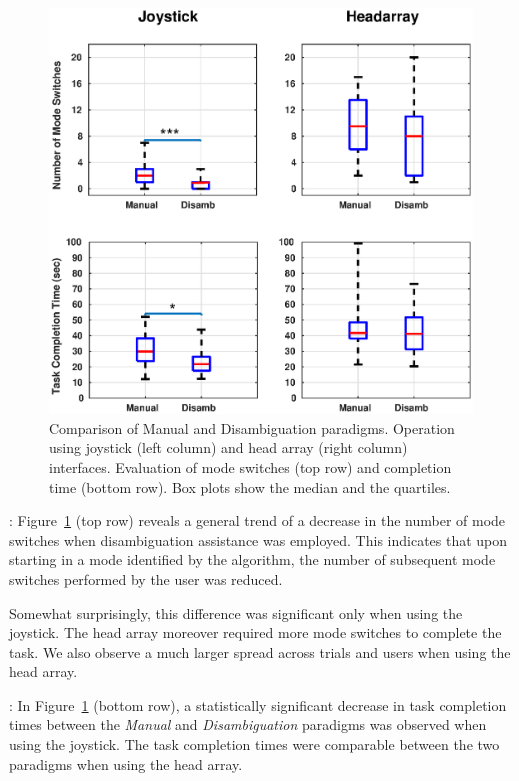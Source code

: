 \documentclass[conference]{IEEEtran}
\begin{document}
\begin{figure}[t]
	\centering
	\includegraphics[width = 1.13\hsize ,center]{./figures/FINAL_BOX_PLOT_8.eps}
	\vspace{-0.7cm}
	\caption{Comparison of Manual and Disambiguation paradigms. Operation using joystick (left column) and head array (right column) interfaces. Evaluation of mode switches (top row) and completion time (bottom row). Box plots show the median and the quartiles.}
	\label{DATAPLOT}
\end{figure}

\vspace{0.1cm}
: Figure~\ref{DATAPLOT} (top row) reveals a general trend of a decrease in the number of mode switches when disambiguation assistance was employed. This indicates that upon starting in a mode identified by the algorithm, the number of subsequent mode switches performed by the user was reduced.
 
Somewhat surprisingly, this difference was significant only when using the joystick. The head array moreover required more mode switches to complete the task. We also observe a much larger spread across trials and users when using the head array.

\vspace{0.1cm}
: 
In Figure~\ref{DATAPLOT} (bottom row), a statistically significant decrease in task completion times between the \textit{Manual} and \textit{Disambiguation} paradigms was observed when using the joystick. The task completion times were comparable between the two paradigms when using the head array.
\end{document}
